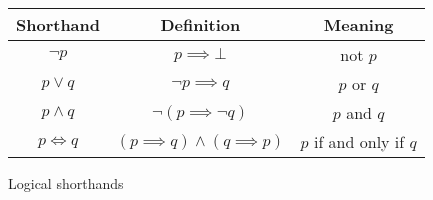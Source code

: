 \documentclass[11pt]{article}
\begin{document}
\begin{figure}[H]
    \caption{Logical shorthands}
    \label{fig:propositionalShorthand}
    \centering
    \begin{tabular}{|c|c|c|}
        \hline
        Shorthand & Definition & Meaning  \\ \hline \hline
        $\neg p$ & $p \implies \bot$ & not $p$ \\ \hline
        $p \lor q$ & $\neg p \implies q$ & $p$ or $q$ \\ \hline  
        $p \land q$ & $\neg(p \implies \neg q)$  & $p$ and $q$ \\ \hline
        $p \iff q$ & $(p \implies q) \land (q \implies p)$& $p$ if and only if $q$ \\ \hline
    \end{tabular}
\end{figure}
\pagebreak
\end{document}
